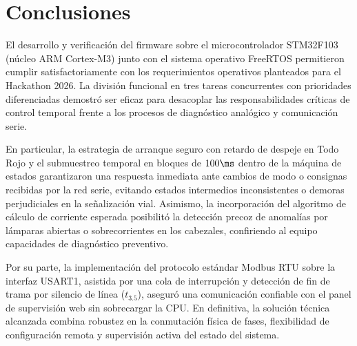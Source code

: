 \chapter{Conclusiones}
\label{sec:conclusiones}

El desarrollo y verificación del firmware sobre el microcontrolador STM32F103 (núcleo ARM Cortex-M3) junto con el
sistema operativo FreeRTOS permitieron cumplir satisfactoriamente con los requerimientos operativos planteados para el
Hackathon 2026.
La división funcional en tres tareas concurrentes con prioridades diferenciadas demostró ser eficaz para desacoplar
las responsabilidades críticas de control temporal frente a los procesos de diagnóstico analógico y comunicación
serie.

En particular, la estrategia de arranque seguro con retardo de despeje en Todo Rojo y el submuestreo temporal en
bloques de $100\ms$ dentro de la máquina de estados garantizaron una respuesta inmediata ante cambios de modo o
consignas recibidas por la red serie, evitando estados intermedios inconsistentes o demoras perjudiciales en la
señalización vial. Asimismo, la incorporación del algoritmo de cálculo de corriente esperada posibilitó la detección
precoz de anomalías por lámparas abiertas o sobrecorrientes en los cabezales, confiriendo al equipo capacidades de
diagnóstico preventivo.

Por su parte, la implementación del protocolo estándar Modbus RTU sobre la interfaz USART1, asistida por una cola de
interrupción y detección de fin de trama por silencio de línea ($t_{3.5}$), aseguró una comunicación confiable con el
panel de supervisión web sin sobrecargar la CPU. En definitiva, la solución técnica alcanzada combina robustez en la
conmutación física de fases, flexibilidad de configuración remota y supervisión activa del estado del sistema.
